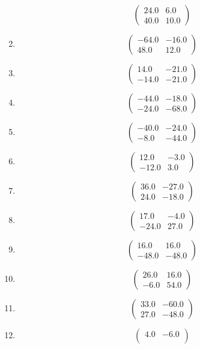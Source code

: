 \documentclass{article}%
\begin{document}
\begin{enumerate}[label=\arabic*)]
\[\begin{pmatrix}
24.0&6.0\\%
40.0&10.0%
\end{pmatrix}%
\]%
\item%
\[%
\begin{pmatrix}%
-64.0&-16.0\\%
48.0&12.0%
\end{pmatrix}%
\]%
\item%
\[%
\begin{pmatrix}%
14.0&-21.0\\%
-14.0&-21.0%
\end{pmatrix}%
\]%
\item%
\[%
\begin{pmatrix}%
-44.0&-18.0\\%
-24.0&-68.0%
\end{pmatrix}%
\]%
\item%
\[%
\begin{pmatrix}%
-40.0&-24.0\\%
-8.0&-44.0%
\end{pmatrix}%
\]%
\item%
\[%
\begin{pmatrix}%
12.0&-3.0\\%
-12.0&3.0%
\end{pmatrix}%
\]%
\item%
\[%
\begin{pmatrix}%
36.0&-27.0\\%
24.0&-18.0%
\end{pmatrix}%
\]%
\item%
\[%
\begin{pmatrix}%
17.0&-4.0\\%
-24.0&27.0%
\end{pmatrix}%
\]%
\item%
\[%
\begin{pmatrix}%
16.0&16.0\\%
-48.0&-48.0%
\end{pmatrix}%
\]%
\item%
\[%
\begin{pmatrix}%
26.0&16.0\\%
-6.0&54.0%
\end{pmatrix}%
\]%
\item%
\[%
\begin{pmatrix}%
33.0&-60.0\\%
27.0&-48.0%
\end{pmatrix}%
\]%
\item%
\[%
\begin{pmatrix}%
4.0&-6.0\\%

\end{pmatrix}\]
\end{enumerate}
\end{document}
